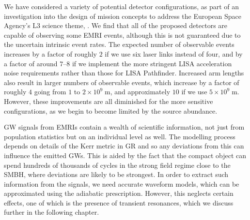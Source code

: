 We have considered a variety of potential detector configurations, as part of an investigation into the design of mission concepts to address the European Space Agency's L3 science theme,  \citep{the_elisa_consortium_gravitational_2013}. We find that all of the proposed detectors are capable of observing some EMRI events, although this is not guaranteed due to the uncertain intrinsic event rates. The expected number of observable events increases by a factor of roughly $2$ if we use six laser links instead of four, and by a factor of around $7$--$8$ if we implement the more stringent LISA acceleration noise requirements rather than those for LISA Pathfinder. Increased arm lengths also result in larger numbers of observable events, which increase by a factor of roughly $4$ going from $1$ to $2\times  10^9\;\mathrm{m}$, and approximately $10$ if we use $5\times  10^9\;\mathrm{m}$. However, these improvements are all diminished for the more sensitive configurations, as we begin to become limited by the source abundance.

GW signals from EMRIs contain a wealth of scientific information, not just from population statistics but on an individual level as well. The modelling process depends on details of the Kerr metric in GR and so any deviations from this can influence the emitted GWs. This is aided by the fact that the compact object can spend hundreds of thousands of cycles in the strong field regime close to the SMBH, where deviations are likely to be strongest. In order to extract such information from the signals, we need accurate waveform models, which can be approximated using the adiabatic prescription. However, this neglects certain effects, one of which is the presence of transient resonances, which we discuss further in the following chapter.



